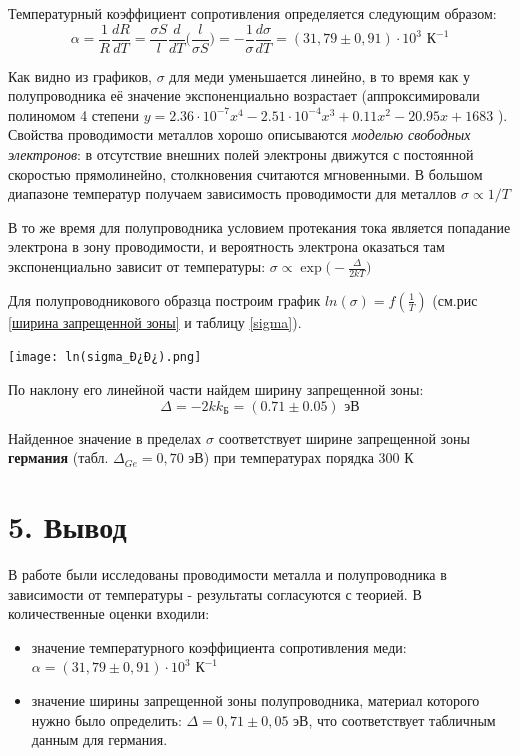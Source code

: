 \documentclass[a4paper,12pt]{report}
\begin{document}
Температурный коэффициент сопротивления определяется следующим образом: 
\begin{equation*}
    \alpha = \frac{1}{R}\frac{dR}{dT} = \frac{\sigma S}{l}\frac{d}{dT}\Big(\frac{l}{\sigma S} \Big) = -\frac{1}{\sigma}\frac{d\sigma}{dT}= (31,79\pm 0,91) \cdot 10^{3} \text{ К}^{-1}
\end{equation*}

Как видно из графиков, $\sigma$ для меди уменьшается линейно, в то время как у полупроводника её значение экспоненциально возрастает (аппроксимировали полиномом 4 степени $y = 2.36\cdot10^{-7} x^{4} - 2.51\cdot10^{-4} x^{3} + 0.11x^{2} - 20.95x + 1683$ ). Свойства проводимости металлов хорошо описываются \textit{моделью свободных электронов}: в отсутствие внешних полей электроны движутся с постоянной скоростью прямолинейно, столкновения считаются мгновенными. В большом диапазоне температур  получаем зависимость проводимости для металлов $\sigma \propto 1/T$ 

В то же время для полупроводника условием протекания тока является попадание электрона в зону проводимости, и вероятность электрона оказаться там экспоненциально зависит от температуры: $\sigma \propto \exp{\Big(-\frac{\Delta}{2kT}\Big)}$

Для полупроводникового образца построим график $ln(\sigma) = f(\frac{1}{T})$ (см.рис \ref{ширина запрещенной зоны} и таблицу \ref{sigma}). 

\begin{center}
    \texttt{[image: ln(sigma\_Ð¿Ð¿).png]}
    \label{ширина запрещенной зоны}
\end{center}

По наклону его линейной части найдем ширину запрещенной зоны:
\begin{equation*}
    \Delta = -2kk_{\text{Б}} = (0.71 \pm 0.05) \text{ эВ}
\end{equation*}

Найденное значение в пределах $\sigma$ соответствует ширине запрещенной зоны \textbf{германия} (табл. $\Delta_{Ge} = 0,70$ эВ) при температурах порядка 300 К

\section*{5. Вывод}

В работе были исследованы проводимости металла и полупроводника в зависимости от температуры - результаты согласуются с теорией. В количественные оценки входили:
\begin{itemize}
    \item значение температурного коэффициента сопротивления меди: $\alpha = (31,79\pm 0,91) \cdot 10^{3} \text{ К}^{-1}$ 
    \item значение ширины запрещенной зоны полупроводника, материал которого нужно было определить: $\Delta = 0,71 \pm 0,05 \text{ эВ}$, что соответствует табличным данным для германия.
\end{itemize}
\end{document}
